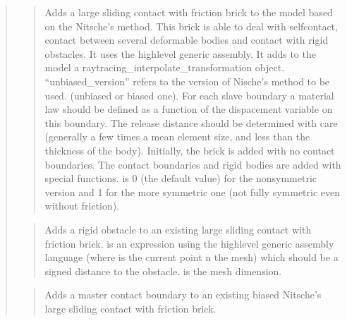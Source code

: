 \documentclass[a4paper,11pt,english]{sphinxmanual}
\begin{document}
\begin{quote}
\begin{quote}
\sphinxAtStartPar
Adds a large sliding contact with friction brick to the model based on the Nitsche’s method.
This brick is able to deal with self\sphinxhyphen{}contact, contact between
several deformable bodies and contact with rigid obstacles.
It uses the high\sphinxhyphen{}level generic assembly. It adds to the model
a raytracing\_interpolate\_transformation object. “unbiased\_version” refers to the version of Nische’s method to be used.
(unbiased or biased one).
For each slave boundary a  material law should be defined as a function of the dispacement variable on this boundary.
The release distance should be determined with care
(generally a few times a mean element size, and less than the
thickness of the body). Initially, the brick is added with no contact
boundaries. The contact boundaries and rigid bodies are added with
special functions.  is 0 (the default value) for the
non\sphinxhyphen{}symmetric version and 1 for the more symmetric one
(not fully symmetric even without friction).
\end{quote}

\sphinxAtStartPar
{}
\begin{quote}

\sphinxAtStartPar
Adds a rigid obstacle to an existing large sliding contact
with friction brick.  is an expression using the high\sphinxhyphen{}level
generic assembly language (where  is the current point n the mesh)
which should be a signed distance to the obstacle.
 is the mesh dimension.
\end{quote}

\sphinxAtStartPar
{}
\begin{quote}

\sphinxAtStartPar
Adds a master contact boundary to an existing biased Nitsche’s large sliding contact
with friction brick.
\end{quote}

\sphinxAtStartPar
{}
\begin{quote}


\end{quote}
\end{quote}
\end{document}
